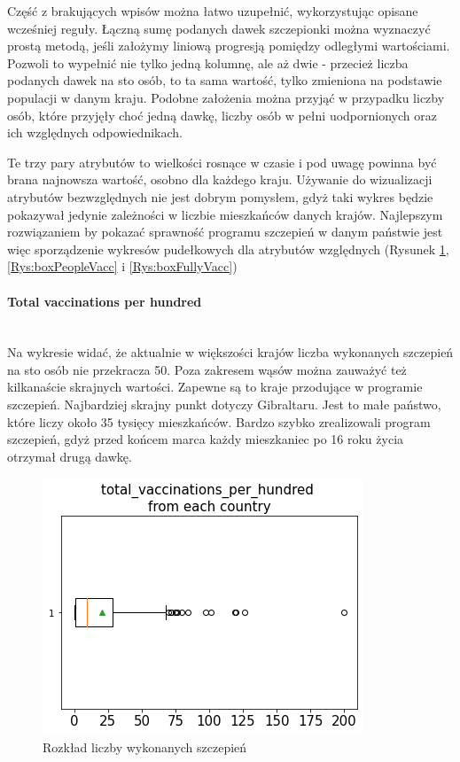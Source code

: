 \documentclass[12pt, oneside]{article}
\begin{document}
Część z brakujących wpisów można łatwo uzupełnić, wykorzystując opisane wcześniej reguły. Łączną sumę podanych dawek szczepionki można wyznaczyć prostą metodą, jeśli założymy liniową progresją pomiędzy odległymi wartościami. Pozwoli to wypełnić nie tylko jedną kolumnę, ale aż dwie - przecież liczba podanych dawek na sto osób, to ta sama wartość, tylko zmieniona na podstawie populacji w danym kraju.  Podobne założenia można przyjąć w przypadku liczby osób, które przyjęły choć jedną dawkę, liczby osób w pełni uodpornionych oraz ich względnych odpowiednikach.


Te trzy pary atrybutów to wielkości rosnące w czasie i pod uwagę powinna być brana najnowsza wartość, osobno dla każdego kraju. Używanie do wizualizacji atrybutów bezwzględnych nie jest dobrym pomysłem, gdyż taki wykres będzie pokazywał jedynie zależności w liczbie mieszkańców danych krajów. Najlepszym rozwiązaniem by pokazać sprawność programu szczepień w danym państwie jest więc sporządzenie wykresów pudełkowych dla atrybutów względnych (Rysunek \ref{Rys:boxTotalVacc}, \ref{Rys:boxPeopleVacc} i \ref{Rys:boxFullyVacc})


\paragraph{Total vaccinations per hundred}
\mbox{}\\

Na wykresie widać, że aktualnie w większości krajów liczba wykonanych szczepień na sto osób nie przekracza 50. Poza zakresem wąsów można zauważyć też kilkanaście skrajnych wartości. Zapewne są to kraje przodujące w programie szczepień. Najbardziej skrajny punkt dotyczy Gibraltaru. Jest to małe państwo, które liczy około 35 tysięcy mieszkańców. Bardzo szybko zrealizowali program szczepień, gdyż przed końcem marca każdy mieszkaniec po 16 roku życia otrzymał drugą dawkę. 
\begin{figure}[!ht]
\centering
\includegraphics[scale=0.5]{../img/box_total_vaccinations.png} 
\caption{Rozkład liczby wykonanych szczepień}
\label{Rys:boxTotalVacc}
\end{figure}
\end{document}
